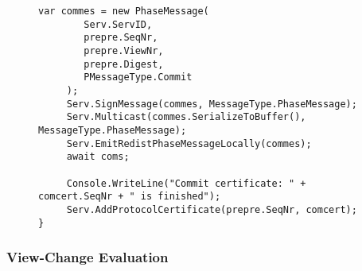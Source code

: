 \begin{figure}[H]
\begin{lstlisting}[label = code:redoprotocol, caption=Redo Protocol Functionality, captionpos = b, basicstyle=\scriptsize]
     var commes = new PhaseMessage(
        Serv.ServID, 
        prepre.SeqNr, 
        prepre.ViewNr, 
        prepre.Digest, 
        PMessageType.Commit
     );
     Serv.SignMessage(commes, MessageType.PhaseMessage);
     Serv.Multicast(commes.SerializeToBuffer(), MessageType.PhaseMessage);
     Serv.EmitRedistPhaseMessageLocally(commes);
     await coms;
     
     Console.WriteLine("Commit certificate: " + comcert.SeqNr + " is finished");
     Serv.AddProtocolCertificate(prepre.SeqNr, comcert);
}
	\end{lstlisting}
\end{figure}

\subsubsection{View-Change Evaluation}